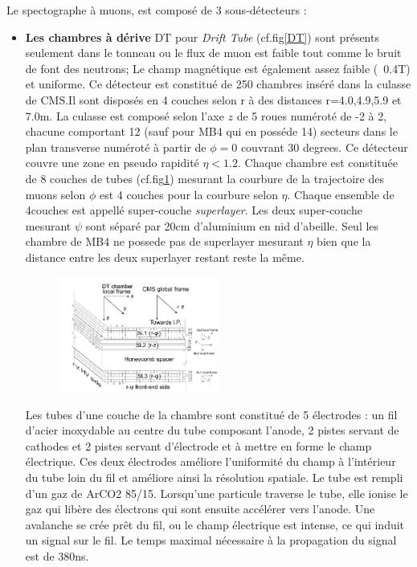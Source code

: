 Le spectographe à muons, est composé de 3 sous-détecteurs :
\begin{itemize}[label=$\bullet$]
	\item \textbf{Les chambres à dérive} DT pour \textit{Drift Tube} (cf.fig\ref{DT}) sont présents seulement dans le tonneau ou le flux de muon est faible tout comme le bruit de font des neutrons; Le champ magnétique est également assez faible (~0.4T) et uniforme. Ce détecteur est constitué de 250 chambres inséré dans la culasse de CMS.Il sont disposés en 4 couches selon r à des distances r=4.0,4.9,5.9 et 7.0m. La culasse est composé selon l'axe $z$ de 5 roues numéroté de -2 à 2, chacune comportant 12 (sauf pour MB4 qui en posséde 14) secteurs dans le plan transverse numéroté à partir de $\phi=0$ couvrant 30 degrees. Ce détecteur couvre une zone en pseudo rapidité $\eta<1.2$. Chaque chambre est constituée de 8 couches de tubes (cf.fig\ref{DT1}) mesurant la courbure de la trajectoire des muons selon $\phi$ est 4 couches pour la courbure selon $\eta$. Chaque ensemble de 4couches est appellé super-couche \textit{superlayer}. Les deux super-couche mesurant $\psi$ sont séparé par 20cm d'aluminium en nid d'abeille. Seul les chambre de MB4 ne possede pas de superlayer mesurant $\eta$ bien que la distance entre les deux superlayer restant reste la même.
	\begin{figure}[ht!]
		\centering
		\includegraphics[width=0.50\textwidth]{CMS/DTchamber.png}
		\label{DT1}
	\end{figure}

    Les tubes d'une couche de la chambre sont constitué de 5 électrodes : un fil d'acier inoxydable au centre du tube composant l'anode, 2 pistes servant de cathodes et 2 pistes servant d'électrode et à mettre en forme le champ électrique. Ces deux électrodes améliore l'uniformité du champ à l'intérieur du tube loin du fil et améliore ainsi la résolution spatiale. Le tube est rempli d'un gaz de ArCO2 85/15. Lorsqu'une particule traverse le tube, elle ionise le gaz qui libère des électrons qui sont ensuite accélérer vers l'anode. Une avalanche se crée prêt du fil, ou le champ électrique est intense, ce qui induit un signal sur le fil. Le temps maximal nécessaire à la propagation du signal est de 380ns. 
    

\end{itemize}
